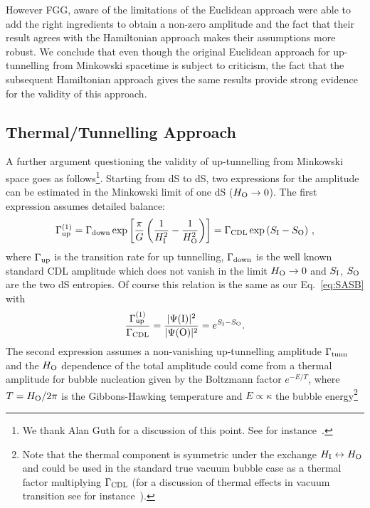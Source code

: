 \documentclass[11pt,a4paper]{article}
\newcommand{\be}{\begin{equation}}
\newcommand{\ee}{\end{equation}}
\begin{document}
However FGG, aware of the limitations of the Euclidean approach were able to add the right ingredients to obtain a non-zero amplitude and the fact that their result agrees with the Hamiltonian approach makes their assumptions more robust. We conclude that even though the original Euclidean approach for up-tunnelling from Minkowski spacetime is subject to criticism, the fact that the subsequent Hamiltonian approach gives the same results provide  strong evidence for the validity of this approach.

\subsection{Thermal/Tunnelling Approach} 

A further argument  questioning the validity of up-tunnelling from Minkowski space goes as follows\footnote{We thank Alan Guth for a discussion of this point. See for instance~\cite{GuthSusskind}.}. Starting from dS to dS, two expressions for the amplitude can be estimated in the Minkowski limit of one dS ($H_{\rm O} \rightarrow 0$). The first expression assumes detailed balance:
\begin{equation} 
\Gamma^{(1)}_{\rm up} = \Gamma_{\rm down} \exp\left[\frac{\pi}{G} \left(\frac{1}{H_{\rm I}^{2}} - \frac{1}{H_{\rm O}^{2}}\right)\right] = \Gamma_{\rm CDL} \exp\left(S_{\rm I} - S_{\rm O}\right)\,,
\label{GuthOne}\end{equation} 
where $\Gamma_{\rm up}$ is the transition rate for up tunnelling, $\Gamma_{\rm down}$ is the well known standard CDL amplitude which does not vanish in the limit $H_{\rm O} \rightarrow 0$ and $S_{\rm I}$, $S_{\rm O}$ are the two dS entropies. Of course this relation is the same as our Eq.~\eqref{eq:SASB} with 
\be
\frac{\Gamma^{(1)}_{\rm{up}}}{\Gamma_{\rm{CDL}}}=\frac{|\Psi({\rm I})|^2}{|\Psi({\rm O})|^2}=e^{S_{\rm I}-S_{\rm O}}.
\ee
The second expression assumes a non-vanishing up-tunnelling amplitude $\Gamma_{\rm tunn}$ and the $H_{\rm O}$ dependence of the total amplitude could come from a thermal amplitude for bubble nucleation given by the Boltzmann factor $e^{-E/T}$, where $T = H_{\rm O}/2\pi$ is the Gibbons-Hawking temperature and $E\propto \kappa$ the bubble energy\footnote{Note that the thermal component is symmetric under the exchange  $H_{\rm I}\leftrightarrow H_{\rm O}$ and could be used in the standard true vacuum bubble case as a thermal factor multiplying $\Gamma_{\rm CDL}$ (for a discussion of thermal effects in vacuum transition see for instance~\cite{Brown:2007sd}).}
\end{document}
